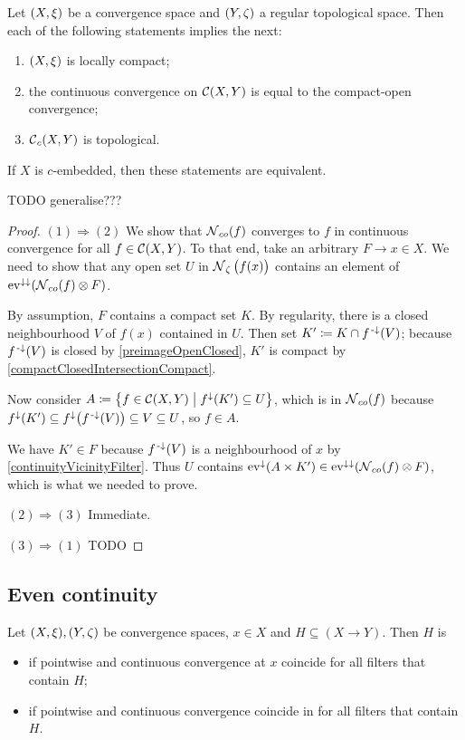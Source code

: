 \begin{proposition} \label{continuousConvergenceCompactOpen}
Let $\sSet{X,\xi}$ be a convergence space and $\sSet{Y,\zeta}$ a regular topological space. Then each of the following statements implies the next:
\begin{enumerate}
\item $\sSet{X,\xi}$ is locally compact;
\item the continuous convergence on $\operatorname{\mathcal{C}}(X,Y)$ is equal to the compact-open convergence;
\item $\operatorname{\mathcal{C}}_c(X,Y)$ is topological.
\end{enumerate}
If $X$ is $c$-embedded, then these statements are equivalent.
\end{proposition}
TODO generalise???
\begin{proof}
$(1) \Rightarrow (2)$ We show that $\operatorname{\mathcal{N}}_{co}(f)$ converges to $f$ in continuous convergence for all $f\in \operatorname{\mathcal{C}}(X,Y)$. To that end, take an arbitrary $F\to x\in X$. We need to show that any open set $U$ in $\operatorname{\mathcal{N}}_\zeta\big(f(x)\big)$ contains an element of $\operatorname{ev}^{\downarrow\downarrow}(\operatorname{\mathcal{N}}_{co}(f)\otimes F)$.

By assumption, $F$ contains a compact set $K$. By regularity, there is a closed neighbourhood $V$ of $f(x)$ contained in $U$. Then set $K' \coloneqq K \cap f^{{\text{\hspace{0.15em}-}\downarrow}}(V)$; because $f^{{\text{\hspace{0.15em}-}\downarrow}}(V)$ is closed by \ref{preimageOpenClosed}, $K'$ is compact by \ref{compactClosedIntersectionCompact}.

Now consider $A \defeq \setbuilder{f\in \cont(X,Y)}{f^\imf(K')\subseteq U}$, which is in $\operatorname{\mathcal{N}}_{co}(f)$ because $f^\downarrow(K')\subseteq f^{\downarrow}\big(f^{{\text{\hspace{0.15em}-}\downarrow}}(V)\big) \subseteq V \subseteq U$, so $f\in A$.

We have $K'\in F$ because $f^{{\text{\hspace{0.15em}-}\downarrow}}(V)$ is a neighbourhood of $x$ by \ref{continuityVicinityFilter}. Thus $U$ contains $\operatorname{ev}^\downarrow(A\times K') \in \operatorname{ev}^{\downarrow\downarrow}(\operatorname{\mathcal{N}}_{co}(f)\otimes F)$, which is what we needed to prove.

$(2) \Rightarrow (3)$ Immediate.

$(3) \Rightarrow (1)$ TODO
\end{proof}

\subsection{Even continuity}
\begin{definition}
Let $\sSet{X,\xi},\sSet{Y, \zeta}$ be convergence spaces, $x\in X$ and $H\subseteq (X\to Y)$. Then $H$ is
\begin{itemize}
\item {} if pointwise and continuous convergence at $x$ coincide for all filters that contain $H$;
\item {} if pointwise and continuous convergence coincide in for all filters that contain $H$.
\end{itemize}
\end{definition}


